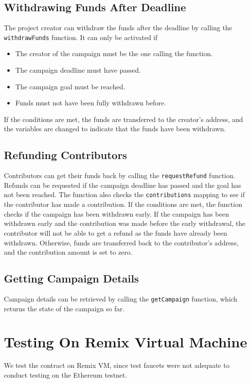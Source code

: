 \documentclass[12pt,reqno]{article}
\begin{document}
\subsection{Withdrawing Funds After Deadline}
The project creator can withdraw the funds after the deadline by calling the \texttt{withdrawFunds}
function. It can only be activated if 
\begin{itemize}
    \item The creator of the campaign must be the one calling the function.
    \item The campaign deadline must have passed. 
    \item The campaign goal must be reached. 
    \item Funds must not have been fully withdrawn before. 
\end{itemize}
If the conditions are met, the funds are transferred to the creator's address, and the
variables are changed to indicate that the funds have been withdrawn. 

\subsection{Refunding Contributors}
Contributors can get their funds back by calling the \texttt{requestRefund} function. Refunds 
can be requested if the campaign deadline has passed and the goal has not been reached. The function 
also checks the \texttt{contributions} mapping to see if the contributor has made a contribution.
If the conditions are met, the function checks if the campaign has been withdrawn early. If the 
campaign has been withdrawn early and the contribution was made before the early withdrawal, the 
contributor will not be able to get a refund as the funds have already been withdrawn. Otherwise, 
funds are transferred back to the contributor's address, and the contribution amount is set to zero.

\subsection{Getting Campaign Details}
Campaign details can be retrieved by calling the \texttt{getCampaign} function, which returns 
the state of the campaign so far. 

\newpage

\section{Testing On Remix Virtual Machine}
We test the contract on Remix VM, since test faucets were not adequate to conduct testing 
on the Ethereum testnet. 
\end{document}
